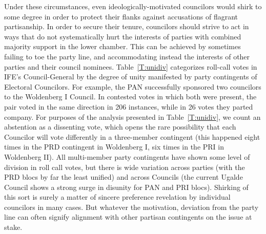 \documentclass[12 pt, letter]{article}
\begin{document}

Under these circumstances, even ideologically-motivated councilors
would shirk to some degree in order to protect their flanks against
accusations of flagrant partisanship.  In order to secure their
tenure, councilors should strive to act in ways that do not
systematically hurt the interests of parties with combined majority
support in the lower chamber.  This can be achieved by sometimes
failing to toe the party line, and accommodating instead the
interests of other parties and their council nominees.
Table~\ref{T:unidiv} categorizes roll-call votes in IFE's
Council-General by the degree of unity manifested by party
contingents of Electoral Councilors.  For example, the PAN
successfully sponsored two councilors to the Woldenberg I Council.
In contested votes in which both were present, the pair voted in the
same direction in 206 instances, while in 26 votes they parted
company.  For purposes of the analysis presented in
Table~\ref{T:unidiv}, we count an abstention as a dissenting vote,
which opens the rare possibility that each Councilor will vote
differently in a three-member contingent (this happened eight times
in the PRD contingent in Woldenberg I, six times in the PRI in
Woldenberg II). All multi-member party contingents have shown some
level of division in roll call votes, but there is wide variation
across parties (with the PRD blocs by far the least unified) and
across Councils (the current Ugalde Council shows a strong surge in
disunity for PAN and PRI blocs). Shirking of this sort is surely a
matter of sincere preference revelation by individual councilors in
many cases.  But whatever the motivation, deviation from the party
line can often signify alignment with other partisan contingents on
the issue at stake.
\end{document}
